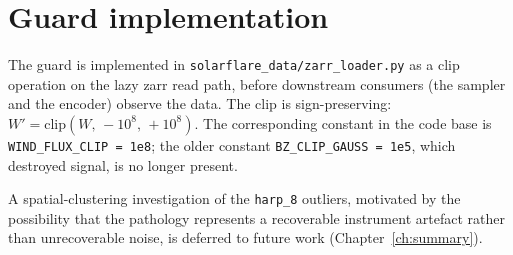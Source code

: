 \section{Guard implementation}
\label{app:clip-impl}

The guard is implemented in
\texttt{solarflare\_data/zarr\_loader.py} as a clip operation on
the lazy zarr read path, before downstream consumers (the
sampler and the encoder) observe the data. The clip is
sign-preserving: $W' = \mathrm{clip}(W,\, -10^{8},\, +10^{8})$.
The corresponding constant in the code base is
\texttt{WIND\_FLUX\_CLIP = 1e8}; the older constant
\texttt{BZ\_CLIP\_GAUSS = 1e5}, which destroyed signal, is no
longer present.

A spatial-clustering investigation of the \texttt{harp\_8}
outliers, motivated by the possibility that the pathology
represents a recoverable instrument artefact rather than
unrecoverable noise, is deferred to future work
(Chapter~\ref{ch:summary}).
